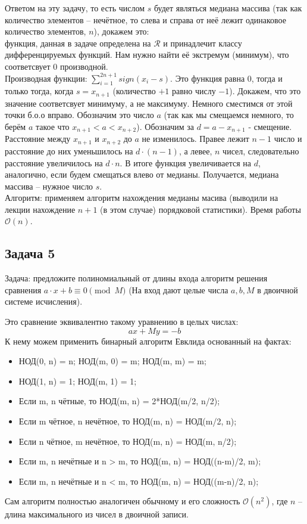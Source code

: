 \documentclass[a4paper,12pt]{article} %
\begin{document}
Ответом на эту задачу, то есть числом $ s $ будет являться медиана массива (так как количество элементов -- нечётное, то  слева и справа от неё лежит одинаковое количество элементов, $ n $), докажем это:\\
функция, данная в задаче определена на $\mathcal{R} $ и принадлечит классу дифференцируемых функций. Нам нужно найти её экстремум (минимум), что соответсвует 0 производной.\\
Производная функции: $ \sum\limits_{i=1}^{2n+1}sign(x_i - s) $. Это функция равна 0, тогда и только тогда, когда $ s = x_{n+1} $ (количество $+1  $ равно числу $ -1 $). Докажем, что это значение соответсвует минимуму, а не максимуму. Немного сместимся от этой точки б.о.о вправо. Обозначим это число $ a $ (так как мы смещаемся немного, то берём $a$ такое что $ x_{n+1} < a < x_{n+2} $). Обозначим за $ d = a - x_{n+1} $ - смещение.\\
Расстояние между $ x_{n+1} $ и  $ x_{n+2} $ до $ a $ не изменилось. Правее лежит $ n - 1 $ число и расстояние до них уменьшилось на $ d \cdot (n - 1) $, а левее, $ n $ чисел, следовательно расстояние увеличилось на $ d \cdot n $. В итоге функция увеличивается на $ d  $, аналогично, если будем смещаться влево от медианы. Получается, медиана массива -- нужное число $ s $.\\

Алгоритм: применяем алгоритм нахождения медианы масива (выводили на лекции нахождение $ n+1 $ (в этом случае) порядковой статистики). Время работы $ \mathcal{O}(n) $.

\subsection*{Задача 5}
Задача:  предложите полиномиальный от длины входа алгоритм решения сравнения $a\cdot x + b\equiv 0\pmod M$ (На вход дают целые числа $a,b,M$ в двоичной системе исчисления).

Это сравнение эквивалентно такому уравнению в целых числах:
$$
ax + My = -b
$$
К нему можем применить бинарный алгоритм Евклида основанный на фактах:
\begin{itemize}
\item НОД(0, n) = n; НОД(m, 0) = m; НОД(m, m) = m;
\item НОД(1, n) = 1; НОД(m, 1) = 1;
\item Если m, n чётные, то НОД(m, n) = 2*НОД(m/2, n/2);
\item Если m чётное, n нечётное, то НОД(m, n) = НОД(m/2, n);
\item Если n чётное, m нечётное, то НОД(m, n) = НОД(m, n/2);
\item Если m, n нечётные и n > m, то НОД(m, n) = НОД((n-m)/2, m);
\item Если m, n нечётные и n < m, то НОД(m, n) = НОД((m-n)/2, n);
\end{itemize}
Сам алгоритм полностью аналогичен обычному и его сложность $ \mathcal{O}(n^2)$, где $ n $ -- длина максимального из чисел в двоичной записи.
\end{document}
